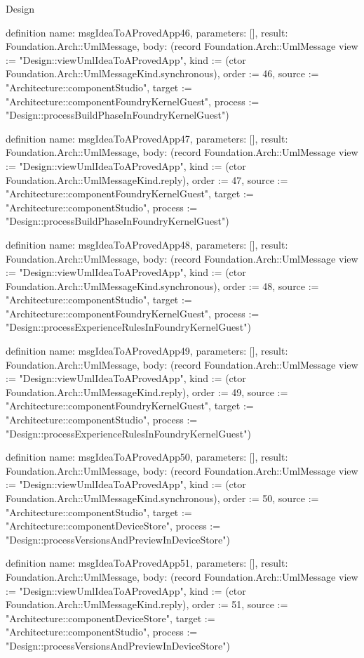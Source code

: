 \begin{lexlean}{Design}
\begin{semanticmodule}
definition{
  name: msgIdeaToAProvedApp46,
  parameters: [],
  result: Foundation.Arch::UmlMessage,
  body: (record Foundation.Arch::UmlMessage {view := "Design::viewUmlIdeaToAProvedApp", kind := (ctor Foundation.Arch::UmlMessageKind.synchronous), order := 46, source := "Architecture::componentStudio", target := "Architecture::componentFoundryKernelGuest", process := "Design::processBuildPhaseInFoundryKernelGuest"})
}

definition{
  name: msgIdeaToAProvedApp47,
  parameters: [],
  result: Foundation.Arch::UmlMessage,
  body: (record Foundation.Arch::UmlMessage {view := "Design::viewUmlIdeaToAProvedApp", kind := (ctor Foundation.Arch::UmlMessageKind.reply), order := 47, source := "Architecture::componentFoundryKernelGuest", target := "Architecture::componentStudio", process := "Design::processBuildPhaseInFoundryKernelGuest"})
}

definition{
  name: msgIdeaToAProvedApp48,
  parameters: [],
  result: Foundation.Arch::UmlMessage,
  body: (record Foundation.Arch::UmlMessage {view := "Design::viewUmlIdeaToAProvedApp", kind := (ctor Foundation.Arch::UmlMessageKind.synchronous), order := 48, source := "Architecture::componentStudio", target := "Architecture::componentFoundryKernelGuest", process := "Design::processExperienceRulesInFoundryKernelGuest"})
}

definition{
  name: msgIdeaToAProvedApp49,
  parameters: [],
  result: Foundation.Arch::UmlMessage,
  body: (record Foundation.Arch::UmlMessage {view := "Design::viewUmlIdeaToAProvedApp", kind := (ctor Foundation.Arch::UmlMessageKind.reply), order := 49, source := "Architecture::componentFoundryKernelGuest", target := "Architecture::componentStudio", process := "Design::processExperienceRulesInFoundryKernelGuest"})
}

definition{
  name: msgIdeaToAProvedApp50,
  parameters: [],
  result: Foundation.Arch::UmlMessage,
  body: (record Foundation.Arch::UmlMessage {view := "Design::viewUmlIdeaToAProvedApp", kind := (ctor Foundation.Arch::UmlMessageKind.synchronous), order := 50, source := "Architecture::componentStudio", target := "Architecture::componentDeviceStore", process := "Design::processVersionsAndPreviewInDeviceStore"})
}

definition{
  name: msgIdeaToAProvedApp51,
  parameters: [],
  result: Foundation.Arch::UmlMessage,
  body: (record Foundation.Arch::UmlMessage {view := "Design::viewUmlIdeaToAProvedApp", kind := (ctor Foundation.Arch::UmlMessageKind.reply), order := 51, source := "Architecture::componentDeviceStore", target := "Architecture::componentStudio", process := "Design::processVersionsAndPreviewInDeviceStore"})
}


\end{semanticmodule}
\end{lexlean}
